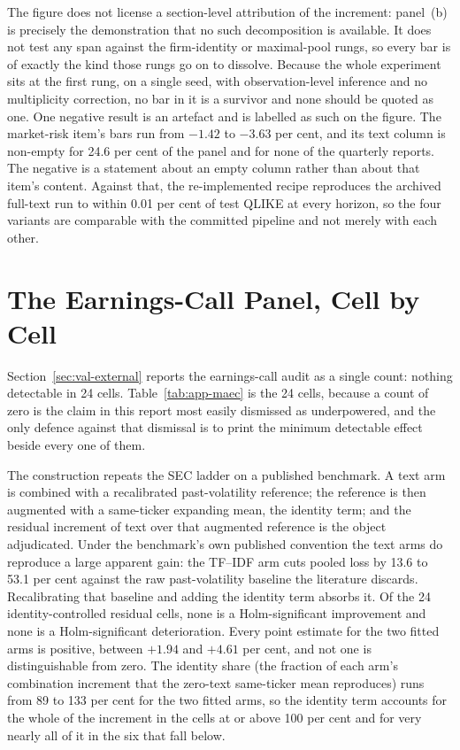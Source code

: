 The figure does not license a section-level attribution of the increment:
panel~(b) is precisely the demonstration that no such decomposition is
available. It does not test any span against the firm-identity or
maximal-pool rungs, so every bar is of exactly the kind those rungs go on to
dissolve. Because the whole experiment sits at the first rung, on a single
seed, with observation-level inference and no multiplicity correction, no bar
in it is a survivor and none should be quoted as one. One negative result is
an artefact and is labelled as such on the figure. The market-risk item's bars
run from $-1.42$ to $-3.63$ per cent, and its text column is non-empty for
24.6 per cent of the panel and for none of the quarterly reports. %
The
negative is a statement about an empty column rather than about that item's
content.
Against that, the re-implemented recipe reproduces the archived full-text run
to within 0.01 per cent of test QLIKE at every horizon, so the four variants
are comparable with the committed pipeline and not merely with each other.

\FloatBarrier
\section{The Earnings-Call Panel, Cell by Cell}
\label{app:res-maec}

Section~\ref{sec:val-external} reports the earnings-call audit as a single
count: nothing detectable in 24 cells. Table~\ref{tab:app-maec} is the
24 cells, because a count of zero is the claim in this report most easily
dismissed as underpowered, and the only defence against that dismissal is
to print the minimum detectable effect beside every one of them.

The construction repeats the SEC ladder on a published benchmark. A text
arm is combined with a recalibrated past-volatility reference; the
reference is then augmented with a same-ticker expanding mean, the
identity term; and the residual increment of text over that augmented
reference is the object adjudicated. Under the benchmark's own published
convention the text arms do reproduce a large apparent gain: the
TF--IDF arm cuts pooled loss by 13.6 to 53.1 per cent against the raw
past-volatility baseline the literature discards. Recalibrating that
baseline and adding the identity term absorbs it. Of the 24
identity-controlled residual cells, none is a Holm-significant improvement
and none is a Holm-significant deterioration. Every point estimate for the
two fitted arms is positive, between $+1.94$ and $+4.61$ per cent, and not
one is distinguishable from zero. The identity share (the fraction of
each arm's combination increment that the zero-text same-ticker mean
reproduces) runs from 89 to 133 per cent for the two fitted arms, so the identity term
accounts for the whole of the increment in the cells at or above 100 per cent
and for very nearly all of it in the six that fall below. %

